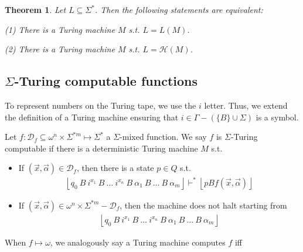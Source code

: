 \documentclass[a4paper, 12pt]{article}
\newtheorem{theorem}{Theorem}
\newtheorem{theorem}{Theorem}
\begin{document}
\begin{theorem}
    Let $L \subseteq \Sigma^{*}$. Then the following statements are equivalent: 

    \textit{(1)} There is a Turing machine $M$ s.t. $L = L(M)$. 

    \textit{(2)} There is a Turing machine $M$ s.t. $L = \mathcal{H}(M)$.
\end{theorem}

\subsection{$\Sigma$-Turing computable functions}

To represent numbers on the Turing tape, we use the $i$ letter. Thus, we extend
the definition of a Turing machine ensuring that $i \in  \Gamma - \left( \{B\}
\cup \Sigma \right) $ is a symbol.

Let $f : \mathcal{D}_f \subseteq \omega^{n} \times \Sigma^{*m} \mapsto
\Sigma^{*}$ a $\Sigma$-mixed function. We say $f$ is $\Sigma$-Turing computable
if there is a deterministic Turing machine $M$ s.t. 

\begin{itemize}
    \item If $(\vec{x}, \vec{\alpha}) \in \mathcal{D}_f$, then there is a state
        $p \in Q$ s.t. 
        \begin{align*}
            \left\lfloor q_0 ~ B ~ i^{x_1} ~ B ~ \ldots ~ i^{x_n} ~ B ~ \alpha_1
            ~ B ~ \ldots ~ B ~ \alpha_m\right\rfloor \vdash^* \left\lfloor pB
            f(\vec{x}, \vec{\alpha}) \right\rfloor
        \end{align*} 

    \item If $(\vec{x}, \vec{\alpha}) \in \omega^{n} \times \Sigma^{*m} -
        \mathcal{D}_f$, then the machine does not halt starting from  
        \begin{align*}
            \left\lfloor q_0 ~ B ~ i^{x_1} ~ B ~ \ldots ~ i^{x_n} ~ B ~ \alpha_1
            ~ B ~ \ldots ~ B ~ \alpha_m\right\rfloor 
        \end{align*}
\end{itemize}

When $f \mapsto \omega$, we analogously say a Turing machine computes $f$ iff
\end{document}
